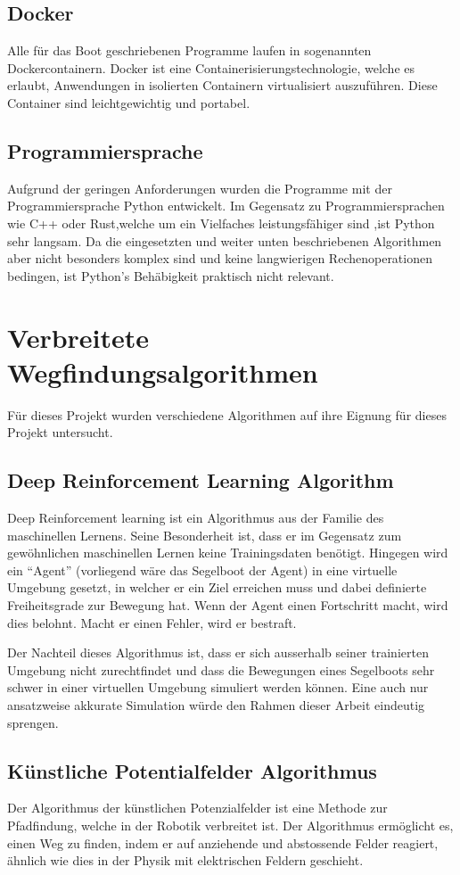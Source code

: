 \subsection*{Docker}
Alle für das Boot geschriebenen Programme laufen in sogenannten Dockercontainern. Docker ist eine Containerisierungstechnologie, welche es erlaubt, Anwendungen in isolierten Containern virtualisiert auszuführen. Diese Container sind leichtgewichtig und portabel.
\subsection*{Programmiersprache}
Aufgrund der geringen Anforderungen wurden die Programme mit der Programmiersprache Python entwickelt. Im Gegensatz zu Programmiersprachen wie C++ oder Rust,welche um ein Vielfaches leistungsfähiger sind ,ist Python sehr langsam. Da die eingesetzten und weiter unten beschriebenen Algorithmen aber nicht besonders komplex sind und keine langwierigen Rechenoperationen bedingen, ist Python's Behäbigkeit praktisch nicht relevant. 
\section{Verbreitete Wegfindungsalgorithmen}
Für dieses Projekt wurden verschiedene Algorithmen auf ihre Eignung für dieses Projekt untersucht.

\subsection{Deep Reinforcement Learning Algorithm }
Deep Reinforcement learning ist ein Algorithmus aus der Familie des maschinellen Lernens. Seine Besonderheit ist, dass er im Gegensatz zum gewöhnlichen maschinellen Lernen keine Trainingsdaten benötigt. Hingegen wird ein \enquote{Agent} (vorliegend wäre das Segelboot der Agent) in eine virtuelle Umgebung gesetzt, in welcher er ein Ziel erreichen muss und dabei definierte Freiheitsgrade zur Bewegung hat. Wenn der Agent einen Fortschritt macht, wird dies belohnt. Macht er einen Fehler, wird er bestraft.

Der Nachteil dieses Algorithmus ist, dass er sich ausserhalb seiner trainierten Umgebung nicht zurechtfindet und dass die Bewegungen eines Segelboots sehr schwer in einer virtuellen Umgebung simuliert werden können. Eine auch nur ansatzweise akkurate Simulation würde den Rahmen dieser Arbeit eindeutig sprengen.
\subsection{Künstliche Potentialfelder Algorithmus} 
Der Algorithmus der künstlichen Potenzialfelder ist eine Methode zur Pfadfindung, welche in der Robotik verbreitet ist. Der Algorithmus ermöglicht es, einen Weg zu finden, indem er auf anziehende und abstossende Felder reagiert, ähnlich wie dies in der Physik mit elektrischen Feldern geschieht.

